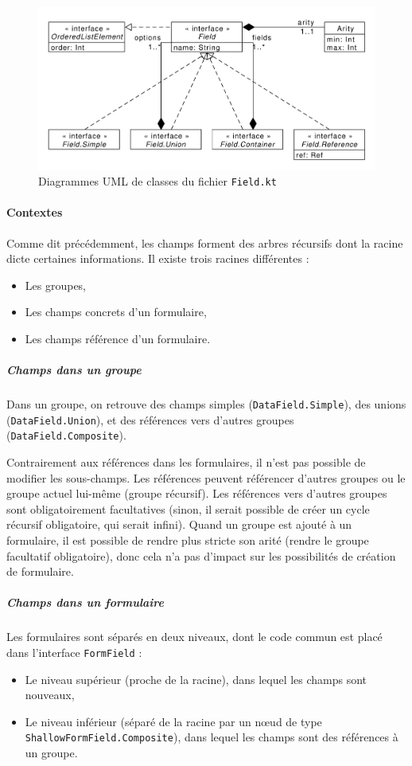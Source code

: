 \begin{figure}[tp]
	\caption{Diagrammes UML de classes du fichier \lstinline{Field.kt}}
	\label{fig:uml-fields}
	\includegraphics[width=\textwidth]{reports-forms-fields}
\end{figure}

\paragraph{Contextes}
Comme dit précédemment, les champs forment des arbres récursifs dont la racine dicte certaines informations.
Il existe trois racines différentes :
\begin{itemize}
	\item Les groupes,
	\item Les champs concrets d'un formulaire,
	\item Les champs référence d'un formulaire.
\end{itemize}

\subparagraph{Champs dans un groupe}
Dans un groupe, on retrouve des champs simples (\lstinline{DataField.Simple}), des unions (\lstinline{DataField.Union}), et des références vers d'autres groupes (\lstinline{DataField.Composite}).

Contrairement aux références dans les formulaires, il n'est pas possible de modifier les sous-champs.
Les références peuvent référencer d'autres groupes ou le groupe actuel lui-même (groupe récursif).
Les références vers d'autres groupes sont obligatoirement facultatives (sinon, il serait possible de créer un cycle récursif obligatoire, qui serait infini).
Quand un groupe est ajouté à un formulaire, il est possible de rendre plus stricte son arité (rendre le groupe facultatif obligatoire), donc cela n'a pas d'impact sur les possibilités de création de formulaire.


\subparagraph{Champs dans un formulaire}
Les formulaires sont séparés en deux niveaux, dont le code commun est placé dans l'interface \lstinline{FormField} :
\begin{itemize}
	\item Le niveau supérieur (proche de la racine), dans lequel les champs sont nouveaux,
	\item Le niveau inférieur (séparé de la racine par un nœud de type \lstinline{ShallowFormField.Composite}), dans lequel les champs sont des références à un groupe.
\end{itemize}

